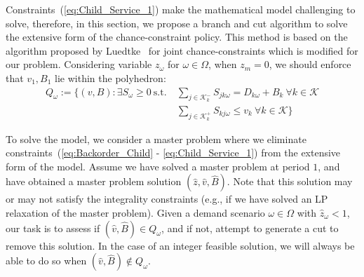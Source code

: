 \documentclass[10pt]{article}
\newcommand{\ka}{k} %
\newcommand{\KA}{\mathcal{K}}
\newcommand{\jey}{j} %
\newcommand{\Bi}{B} %
\newcommand{\Vi}{v} %
\newcommand{\Es}{S} %
\newcommand{\Zed}{z} %
\newcommand{\m}{\omega} %
\newcommand{\EM}{\Omega} %
\newcommand{\Csub}{\mathcal{K}^+_k}
\newcommand{\Psub}{\mathcal{K}^-_k}
\begin{document}
 Constraints~(\ref{eq:Child_Service_1}) make the mathematical model challenging to solve, therefore, in this section, we propose a branch and cut algorithm to solve the extensive form of the chance-constraint policy. This method is based on the algorithm proposed by Luedtke~\cite{luedtke2014branch} for joint chance-constraints which is modified for our problem. 
 Considering variable $\Zed_\m$ for $\m \in \EM$, when $\Zed_m=0$, we should enforce that $\Vi_{1}, \Bi_{1}$ lie within the polyhedron:
\begin{align*} Q_\m := \{ (\Vi,\Bi) :  \exists \Es_\m \geq 0 \ \text{s.t.} \ 
 & \sum_{\jey \in  \Psub} \Es_{\jey \ka \m} = D_{\ka \m} + \Bi_\ka \ \forall \ka  \in \KA \\
 & \sum_{\jey \in  \Csub} \Es_{\ka \jey \m} \leq \Vi_\ka \ \forall \ka  \in \KA \}
 \end{align*}
 
\newcommand{\vsol}{\hat{\Vi}}
\newcommand{\zsol}{\hat{\Zed}}
\newcommand{\bsol}{\hat{\Bi}}
\newcommand{\pisol}{\hat{\pi}}
\newcommand{\betasol}{\hat{\beta}}

To solve the model, we consider a  master problem where we eliminate constraints~(\ref{eq:Backorder_Child} - \ref{eq:Child_Service_1}) from the extensive form of the model. Assume we have solved a master problem at period $1$, and have obtained a master problem solution $(\zsol,\vsol,\bsol)$. Note that this solution may or may not satisfy the integrality constraints (e.g., if we have solved an LP relaxation of the master problem). Given a demand scenario $\m \in \EM$ with $\zsol_\m < 1$, our task is to assess if $(\vsol,\bsol) \in Q_\m$, and if not, attempt to generate a cut to remove this solution. In the case of an integer feasible solution, we will always be able to do so when $(\vsol,\bsol) \notin Q_\m$.
\end{document}
